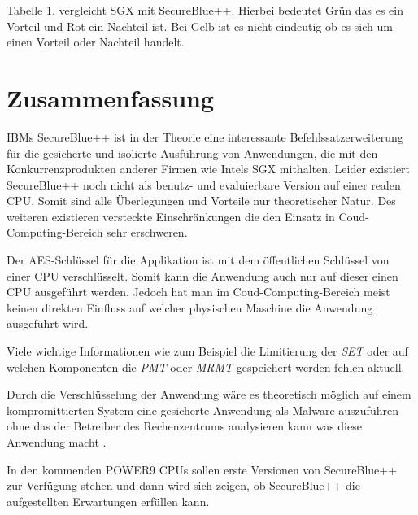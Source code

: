 \documentclass[ngerman]{sig-alternate-05-2015}
\begin{document}
Tabelle 1. vergleicht SGX mit SecureBlue++. Hierbei bedeutet Grün das es ein Vorteil und Rot ein Nachteil ist. Bei Gelb ist es nicht eindeutig ob es sich um einen Vorteil oder Nachteil handelt. 

\section{Zusammenfassung}
IBMs SecureBlue++ ist in der Theorie eine interessante Befehlssatzerweiterung für die gesicherte und isolierte Ausführung von Anwendungen, die mit den Konkurrenzprodukten anderer Firmen wie Intels SGX mithalten. Leider existiert SecureBlue++ noch nicht als benutz- und evaluierbare Version auf einer realen CPU. Somit sind alle Überlegungen und Vorteile nur theoretischer Natur. Des weiteren existieren versteckte Einschränkungen die den Einsatz in Coud-Computing-Bereich sehr erschweren. 

Der AES-Schlüssel für die Applikation ist mit dem öffentlichen Schlüssel von einer CPU verschlüsselt. Somit kann die Anwendung auch nur auf dieser einen CPU ausgeführt werden. Jedoch hat man im Coud-Computing-Bereich meist keinen direkten Einfluss auf welcher physischen Maschine die Anwendung ausgeführt wird. 

Viele wichtige Informationen wie zum Beispiel die Limitierung der \emph{SET} oder auf welchen Komponenten die \emph{PMT} oder \emph{MRMT} gespeichert werden fehlen aktuell. 

Durch die Verschlüsselung der Anwendung wäre es theoretisch möglich auf einem kompromittierten System eine gesicherte Anwendung als Malware auszuführen ohne das der Betreiber des Rechenzentrums analysieren kann was diese Anwendung macht \cite{davenport2014sgx}.

In den kommenden POWER9 CPUs sollen erste Versionen von SecureBlue++ zur Verfügung stehen und dann wird sich zeigen, ob SecureBlue++ die aufgestellten Erwartungen erfüllen kann.

\small

  
\end{document}
